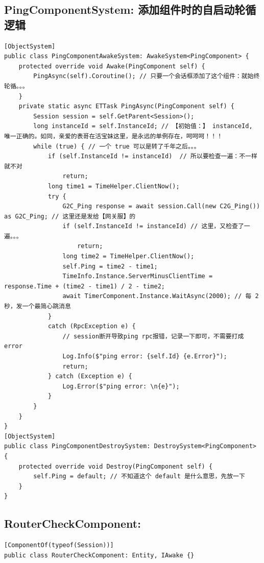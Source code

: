 \documentclass[9pt, b5paper]{article}
\begin{document}
\subsection{PingComponentSystem: 添加组件时的自启动轮循逻辑}
\label{sec-7-17}
\begin{verbatim}
[ObjectSystem]
public class PingComponentAwakeSystem: AwakeSystem<PingComponent> {
    protected override void Awake(PingComponent self) {
        PingAsync(self).Coroutine(); // 只要一个会话框添加了这个组件：就始终轮循。。。
    }
    private static async ETTask PingAsync(PingComponent self) {
        Session session = self.GetParent<Session>();
        long instanceId = self.InstanceId; // 【初始值：】 instanceId, 唯一正确的。如同，亲爱的表哥在活宝妹这里，是永远的单例存在，呵呵呵！！！
        while (true) { // 一个 true 可以是转了千年之后。。。
            if (self.InstanceId != instanceId)  // 所以要检查一遍：不一样就不对
                return;
            long time1 = TimeHelper.ClientNow();
            try {
                G2C_Ping response = await session.Call(new C2G_Ping()) as G2C_Ping; // 这里还是发给【网关服】的
                if (self.InstanceId != instanceId) // 这里，又检查了一遍。。。 
                    return;
                long time2 = TimeHelper.ClientNow();
                self.Ping = time2 - time1;
                TimeInfo.Instance.ServerMinusClientTime = response.Time + (time2 - time1) / 2 - time2;
                await TimerComponent.Instance.WaitAsync(2000); // 每 2 秒，发一个最简心跳消息
            }
            catch (RpcException e) {
                // session断开导致ping rpc报错，记录一下即可，不需要打成error
                Log.Info($"ping error: {self.Id} {e.Error}");
                return;
            } catch (Exception e) {
                Log.Error($"ping error: \n{e}");
            }
        }
    }
}
[ObjectSystem]
public class PingComponentDestroySystem: DestroySystem<PingComponent> {
    protected override void Destroy(PingComponent self) {
        self.Ping = default; // 不知道这个 default 是什么意思，先放一下
    }
}
\end{verbatim}
\subsection{RouterCheckComponent:}
\label{sec-7-18}
\begin{verbatim}
[ComponentOf(typeof(Session))]
public class RouterCheckComponent: Entity, IAwake {}
\end{verbatim}
\end{document}
